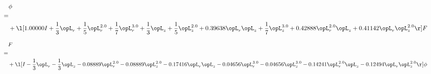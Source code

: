 \begin{alignat}{2} 
\label{eq:scalarFlux_1} 
& \phi \nonumber \\ 
 = \\ 
& + \l[  1.00000 I + \frac{1}{3} \opL_r + \frac{1}{5} \opL_r^{2.0} + \frac{1}{7} \opL_r^{3.0} + \frac{1}{3} \opL_z + \frac{1}{5} \opL_z^{2.0} +  0.39638 \opL_r \opL_z + \frac{1}{7} \opL_z^{3.0} +  0.42888 \opL_r^{2.0} \opL_z +  0.41142 \opL_r \opL_z^{2.0}  \r] F \nonumber \\ 
\end{alignat} 


\begin{alignat}{2} 
\label{eq:transport3D_0} 
& F \nonumber \\ 
 = \\ 
& + \l[ I - \frac{1}{3} \opL_r - \frac{1}{3} \opL_z   -0.08889 \opL_r^{2.0}   -0.08889 \opL_z^{2.0}   -0.17416 \opL_r \opL_z   -0.04656 \opL_r^{3.0}   -0.04656 \opL_z^{3.0}   -0.14241 \opL_r^{2.0} \opL_z   -0.12494 \opL_r \opL_z^{2.0}  \r] \phi \nonumber \\ 
\end{alignat} 


